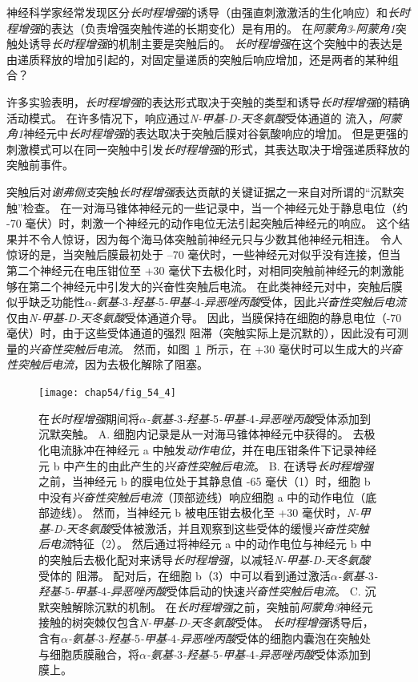 神经科学家经常发现区分\textit{长时程增强}的诱导（由强直刺激激活的生化响应）和\textit{长时程增强}的表达（负责增强突触传递的长期变化）是有用的。
在\textit{阿蒙角3}-\textit{阿蒙角1}突触处诱导\textit{长时程增强}的机制主要是突触后的。
\textit{长时程增强}在这个突触中的表达是由递质释放的增加引起的，对固定量递质的突触后响应增加，还是两者的某种组合？


许多实验表明，\textit{长时程增强}的表达形式取决于突触的类型和诱导\textit{长时程增强}的精确活动模式。
在许多情况下，响应通过\textit{N-甲基-D-天冬氨酸}受体通道的  流入，\textit{阿蒙角1}神经元中\textit{长时程增强}的表达取决于突触后膜对谷氨酸响应的增加。
但是更强的刺激模式可以在同一突触中引发\textit{长时程增强}的形式，其表达取决于增强递质释放的突触前事件。


突触后对\textit{谢弗侧支}突触\textit{长时程增强}表达贡献的关键证据之一来自对所谓的“沉默突触”检查。
在一对海马锥体神经元的一些记录中，当一个神经元处于静息电位（约 -70 毫伏）时，刺激一个神经元的动作电位无法引起突触后神经元的响应。
这个结果并不令人惊讶，因为每个海马体突触前神经元只与少数其他神经元相连。
令人惊讶的是，当突触后膜最初处于 –70 毫伏时，一些神经元对似乎没有连接，但当第二个神经元在电压钳位至 +30 毫伏下去极化时，对相同突触前神经元的刺激能够在第二个神经元中引发大的兴奋性突触后电流。
在此类神经元对中，突触后膜似乎缺乏功能性\textit{$\alpha$-氨基-}3\textit{-羟基-}5\textit{-甲基-}4\textit{-异恶唑丙酸}受体，因此\textit{兴奋性突触后电流}仅由\textit{N-甲基-D-天冬氨酸}受体通道介导。
因此，当膜保持在细胞的静息电位（-70 毫伏）时，由于这些受体通道的强烈  阻滞（突触实际上是沉默的），因此没有可测量的\textit{兴奋性突触后电流}。
然而，如图~\ref{fig:54_4}~所示，在 +30 毫伏时可以生成大的\textit{兴奋性突触后电流}，因为去极化解除了阻塞。


\begin{figure}[htbp]
	\centering
	\texttt{[image: chap54/fig\_54\_4]}
	\caption{在\textit{长时程增强}期间将\textit{$\alpha$-氨基-}3\textit{-羟基-}5\textit{-甲基-}4\textit{-异恶唑丙酸}受体添加到沉默突触。
		A. 细胞内记录是从一对海马锥体神经元中获得的。
		去极化电流脉冲在神经元 a 中触发\textit{动作电位}，并在电压钳条件下记录神经元 b 中产生的由此产生的\textit{兴奋性突触后电流}。
		B. 在诱导\textit{长时程增强}之前，当神经元 b 的膜电位处于其静息值 -65 毫伏（1）时，细胞 b 中没有\textit{兴奋性突触后电流}（顶部迹线）响应细胞 a 中的动作电位（底部迹线）。
		然而，当神经元 b 被电压钳去极化至 +30 毫伏时，\textit{N-甲基-D-天冬氨酸}受体被激活，并且观察到这些受体的缓慢\textit{兴奋性突触后电流}特征（2）。
		然后通过将神经元 a 中的动作电位与神经元 b 中的突触后去极化配对来诱导\textit{长时程增强}，以减轻\textit{N-甲基-D-天冬氨酸}受体的  阻滞。
		配对后，在细胞 b（3）中可以看到通过激活\textit{$\alpha$-氨基-}3\textit{-羟基-}5\textit{-甲基-}4\textit{-异恶唑丙酸}受体启动的快速\textit{兴奋性突触后电流}\cite{montgomery2001pair}。
		C. 沉默突触解除沉默的机制。
		在\textit{长时程增强}之前，突触前\textit{阿蒙角3}神经元接触的树突棘仅包含\textit{N-甲基-D-天冬氨酸}受体。
		\textit{长时程增强}诱导后，含有\textit{$\alpha$-氨基-}3\textit{-羟基-}5\textit{-甲基-}4\textit{-异恶唑丙酸}受体的细胞内囊泡在突触处与细胞质膜融合，将\textit{$\alpha$-氨基-}3\textit{-羟基-}5\textit{-甲基-}4\textit{-异恶唑丙酸}受体添加到膜上。}
	\label{fig:54_4}
\end{figure}



